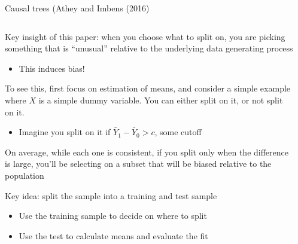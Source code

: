 \documentclass[notes,11pt, aspectratio=169]{beamer}
\newenvironment{wideitemize}{\itemize\addtolength{\itemsep}{10pt}}{\enditemize}
\begin{document}
\begin{frame}{Causal trees (Athey and Imbens (2016)}
    \begin{columns}[onlytextwidth, T] %
      \begin{column}{.8\textwidth}
        \begin{wideitemize}
        \item Key insight of this paper: when you choose what to split
          on, you are picking something that is ``unusual'' relative
          to the underlying data generating process
          \begin{itemize}
          \item This induces bias!
          \end{itemize}
        \item To see this, first focus on estimation of means, and 
          consider a simple example where $X$ is a simple dummy
          variable. You can either split on it, or not split on it.
          \begin{itemize}
          \item Imagine you split on it if $\bar{Y}_{1} - \bar{Y}_{0} > c$, some cutoff
          \end{itemize}
        \item On average, while each one is consistent, if you split
          only when the difference is large, you'll be selecting on a
          subset that will be biased relative to the population
        \item Key idea: split the sample into a training and test sample
          \begin{itemize}
          \item Use the training sample to decide on where to split
          \item Use the test to calculate means and evaluate the fit
          \end{itemize}
        \end{wideitemize}
      \end{column}%
      \hfill%
      \begin{column}{.5\textwidth}
      \end{column}%
    \end{columns}
\end{frame}
\end{document}

